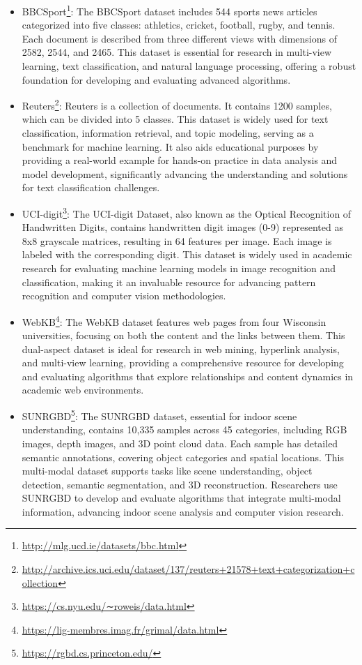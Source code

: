 \documentclass{article}
\theoremstyle{plain}
\theoremstyle{definition}
\theoremstyle{remark}
\begin{document}
\begin{itemize}
\item BBCSport\footnote{\url{http://mlg.ucd.ie/datasets/bbc.html}}: The BBCSport dataset includes 544 sports news articles categorized into five classes: athletics, cricket, football, rugby, and tennis. Each document is described from three different views with dimensions of 2582, 2544, and 2465. This dataset is essential for research in multi-view learning, text classification, and natural language processing, offering a robust foundation for developing and evaluating advanced algorithms.


\item Reuters\footnote{\url{http://archive.ics.uci.edu/dataset/137/reuters+21578+text+categorization+collection}}: Reuters is a collection of documents. It contains 1200 samples, which can be divided into 5 classes. This dataset is widely used for text classification, information retrieval, and topic modeling, serving as a benchmark for machine learning. It also aids educational purposes by providing a real-world example for hands-on practice in data analysis and model development, significantly advancing the understanding and solutions for text classification challenges.


\item UCI-digit\footnote{\url{https://cs.nyu.edu/∼roweis/data.html}}: The UCI-digit Dataset, also known as the Optical Recognition of Handwritten Digits, contains handwritten digit images (0-9) represented as 8x8 grayscale matrices, resulting in 64 features per image. Each image is labeled with the corresponding digit. This dataset is widely used in academic research for evaluating machine learning models in image recognition and classification, making it an invaluable resource for advancing pattern recognition and computer vision methodologies.


\item WebKB\footnote{\url{https://lig-membres.imag.fr/grimal/data.html}}: The WebKB dataset features web pages from four Wisconsin universities, focusing on both the content and the links between them. This dual-aspect dataset is ideal for research in web mining, hyperlink analysis, and multi-view learning, providing a comprehensive resource for developing and evaluating algorithms that explore relationships and content dynamics in academic web environments.

\item SUNRGBD\footnote{\url{https://rgbd.cs.princeton.edu/}}: The SUNRGBD dataset, essential for indoor scene understanding, contains 10,335 samples across 45 categories, including RGB images, depth images, and 3D point cloud data. Each sample has detailed semantic annotations, covering object categories and spatial locations. This multi-modal dataset supports tasks like scene understanding, object detection, semantic segmentation, and 3D reconstruction. Researchers use SUNRGBD to develop and evaluate algorithms that integrate multi-modal information, advancing indoor scene analysis and computer vision research.


\end{itemize}
\end{document}
